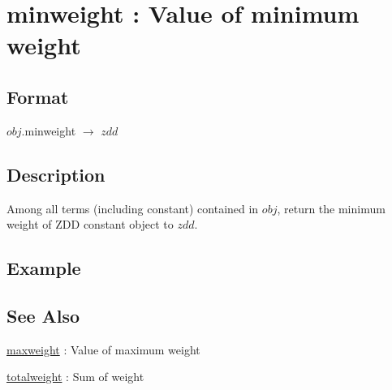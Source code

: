 
\section{minweight : Value of minimum weight\label{sect:minweight}}
\subsection*{Format}
$obj$.minweight $\rightarrow$ $zdd$

\subsection*{Description}
Among all terms (including constant) contained in $obj$, return the minimum weight of ZDD constant object to $zdd$. 

\subsection*{Example}


\subsection*{See Also}
\hyperref[sect:maxweight]{maxweight} : Value of maximum weight

\hyperref[sect:totalweight]{totalweight} : Sum of weight
